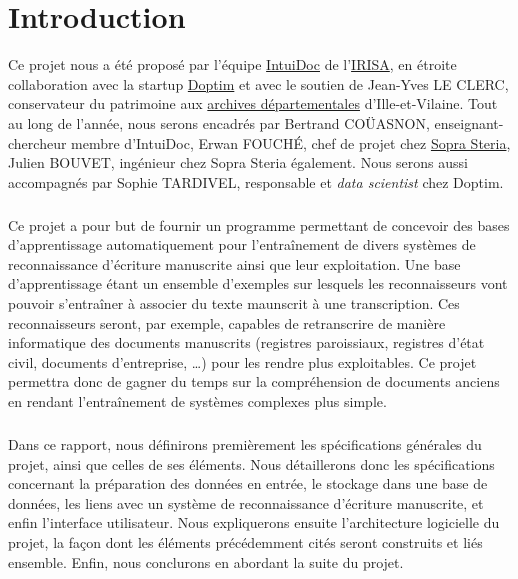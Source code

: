 \chapter{Introduction}
\setcounter{page}{1}
\pagestyle{fancy}
\fancyhf{}
\cfoot[\thepage]{\thepage}

Ce projet nous a été proposé par l’équipe \href{https://www-intuidoc.irisa.fr/}{IntuiDoc}
de l’\href{https://www.irisa.fr/}{IRISA}, en étroite collaboration avec la startup
\href{http://www.doptim.eu}{Doptim} et avec le soutien de Jean-Yves LE CLERC, conservateur du
patrimoine aux \href{http://archives.ille-et-vilaine.fr/fr}{archives départementales} d'Ille-et-Vilaine.
Tout au long de l’année, nous serons encadrés par Bertrand COÜASNON, enseignant-chercheur membre d'IntuiDoc,
Erwan FOUCHÉ, chef de projet chez \href{https://www.soprasteria.com/fr}{Sopra Steria}, Julien BOUVET,
ingénieur chez Sopra Steria également. Nous serons aussi accompagnés par Sophie TARDIVEL, responsable
et \textit{data scientist} chez Doptim.

\paragraph{}
Ce projet a pour but de fournir un programme permettant de concevoir des bases d’apprentissage
automatiquement pour l’entraînement de divers systèmes de reconnaissance d’écriture manuscrite
ainsi que leur exploitation. Une base d'apprentissage étant un ensemble d'exemples sur lesquels les reconnaisseurs vont pouvoir s'entraîner à associer du texte maunscrit à une transcription. Ces reconnaisseurs seront, par exemple, capables de retranscrire
de manière informatique des documents manuscrits (registres paroissiaux, registres d’état civil,
documents d’entreprise, \ldots) pour les rendre plus exploitables. Ce projet permettra donc de gagner
du temps sur la compréhension de documents anciens en rendant l’entraînement de systèmes complexes
plus simple.

\paragraph{}
Dans ce rapport, nous définirons premièrement les spécifications générales du
projet, ainsi que celles de ses éléments. Nous détaillerons donc les
spécifications concernant la préparation des données en entrée, le stockage
dans une base de données, les liens avec un système de reconnaissance
d’écriture manuscrite, et enfin l’interface utilisateur. Nous expliquerons
ensuite l’architecture logicielle du projet, la façon dont les éléments
précédemment cités seront construits et liés ensemble. Enfin, nous conclurons
en abordant la suite du projet.
